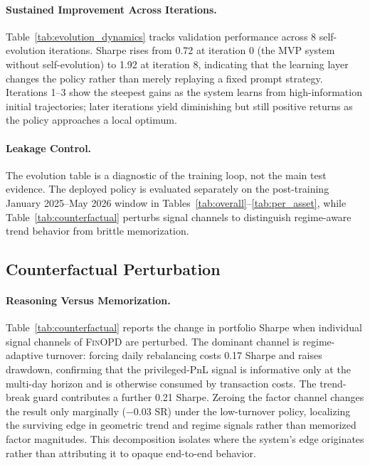 \paragraph{Sustained Improvement Across Iterations.} Table~\ref{tab:evolution_dynamics} tracks validation performance across 8 self-evolution iterations. Sharpe rises from 0.72 at iteration 0 (the MVP system without self-evolution) to 1.92 at iteration 8, indicating that the learning layer changes the policy rather than merely replaying a fixed prompt strategy. Iterations 1--3 show the steepest gains as the system learns from high-information initial trajectories; later iterations yield diminishing but still positive returns as the policy approaches a local optimum.

\paragraph{Leakage Control.} The evolution table is a diagnostic of the training loop, not the main test evidence. The deployed policy is evaluated separately on the post-training January 2025--May 2026 window in Tables~\ref{tab:overall}--\ref{tab:per_asset}, while Table~\ref{tab:counterfactual} perturbs signal channels to distinguish regime-aware trend behavior from brittle memorization.


\subsection{Counterfactual Perturbation}



\paragraph{Reasoning Versus Memorization.} Table~\ref{tab:counterfactual} reports the change in portfolio Sharpe when individual signal channels of \textsc{FinOPD} are perturbed. The dominant channel is regime-adaptive turnover: forcing daily rebalancing costs 0.17 Sharpe and raises drawdown, confirming that the privileged-PnL signal is informative only at the multi-day horizon and is otherwise consumed by transaction costs. The trend-break guard contributes a further 0.21 Sharpe. Zeroing the factor channel changes the result only marginally ($-$0.03 SR) under the low-turnover policy, localizing the surviving edge in geometric trend and regime signals rather than memorized factor magnitudes. This decomposition isolates where the system's edge originates rather than attributing it to opaque end-to-end behavior.

